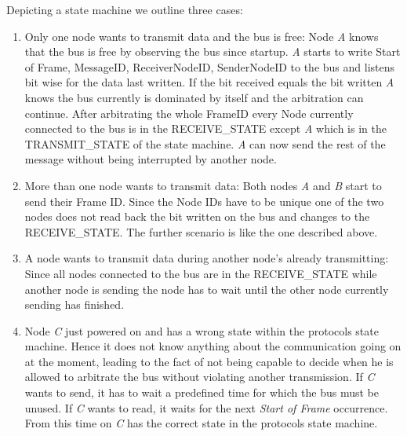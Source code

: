 Depicting a state machine we outline three cases:
\begin{enumerate}
 \item Only one node wants to transmit data and the bus is free: Node \textit{A} knows that the bus is free by 
observing the bus since startup. \textit{A} starts to write Start of Frame, MessageID, ReceiverNodeID, SenderNodeID  
to the bus and listens bit wise for the data last written.
       If the bit received equals the bit written \textit{A} knows the bus currently is dominated by itself and 
the arbitration can continue. After arbitrating the whole FrameID every Node currently connected to the bus is 
in the RECEIVE\_STATE except \textit{A} which is in the TRANSMIT\_STATE of the state machine.
       \textit{A} can now send the rest of the message without being interrupted by another node.

 \item More than one node wants to transmit data: Both nodes \textit{A} and \textit{B} start to send 
their Frame ID. Since the Node IDs have to be unique one of the two nodes does not read back the bit written on the bus and changes to the RECEIVE\_STATE. The further scenario is like the one described above.

 \item A node wants to transmit data during another node's already transmitting: Since all nodes connected to the bus are in the RECEIVE\_STATE while another node is sending the node has to wait until the other node currently sending has finished.

 \item Node \textit{C} just powered on and has a wrong state within the protocols state machine. Hence it does not know anything about the communication going on at the moment, leading to the fact of not being capable to decide when he is allowed to arbitrate the bus without violating another transmission.
       If \textit{C} wants to send, it has to wait a predefined time for which the bus must be unused. 
If \textit{C} wants to read, it waits for the next \textit{Start of Frame} occurrence. From this time on \textit{C} has the correct state in the protocols state machine.
\end{enumerate}


